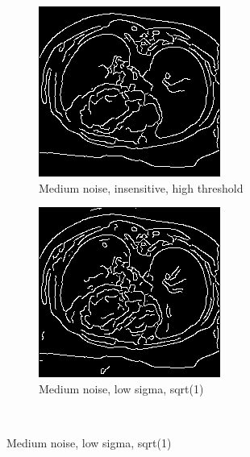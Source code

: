 \begin{figure}[H]
  \begin{subfigure}{.5\textwidth}
    \centering
    \includegraphics[width=.9\textwidth]{./edgedetection/medium_noise/m_noise_insens_h_thres}
    \caption{Medium noise, insensitive, high threshold}
    \label{fig:m_noise_insens_h_thres}
  \end{subfigure}%
  
    \begin{subfigure}{.5\textwidth}
    \centering
    \includegraphics[width=.9\textwidth]{./edgedetection/medium_noise/m_noise_insens_l_thres}
    \caption{Medium noise, low sigma, sqrt(1)}
    \label{fig:m_noise_insens_l_thres}
  \end{subfigure}\\%
  

\end{figure}
